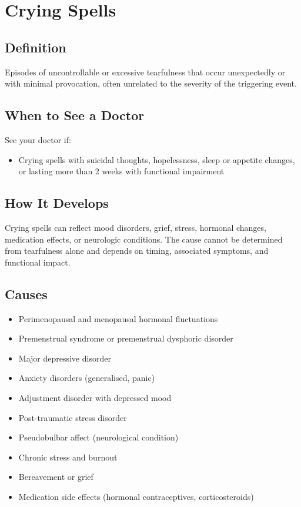 \chapter{Crying Spells}

\section*{Definition}
Episodes of uncontrollable or excessive tearfulness that occur unexpectedly or with minimal provocation, often unrelated to the severity of the triggering event.

\section*{When to See a Doctor}
See your doctor if:
\begin{itemize}
  \item Crying spells with suicidal thoughts, hopelessness, sleep or appetite changes, or lasting more than 2 weeks with functional impairment
\end{itemize}

\section*{How It Develops}
Crying spells can reflect mood disorders, grief, stress, hormonal changes, medication effects, or neurologic conditions. The cause cannot be determined from tearfulness alone and depends on timing, associated symptoms, and functional impact.

\section*{Causes}
\begin{itemize}
  \item Perimenopausal and menopausal hormonal fluctuations
  \item Premenstrual syndrome or premenstrual dysphoric disorder
  \item Major depressive disorder
  \item Anxiety disorders (generalised, panic)
  \item Adjustment disorder with depressed mood
  \item Post-traumatic stress disorder
  \item Pseudobulbar affect (neurological condition)
  \item Chronic stress and burnout
  \item Bereavement or grief
  \item Medication side effects (hormonal contraceptives, corticosteroids)
\end{itemize}

